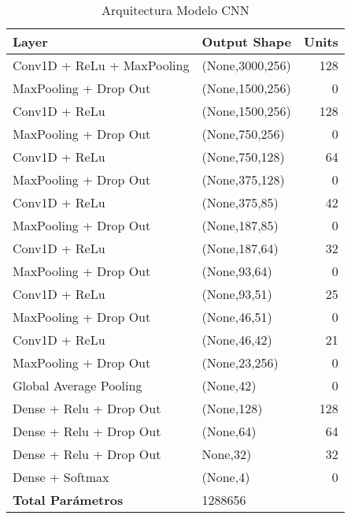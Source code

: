         \begin{table}[htpb]
            \caption{Arquitectura Modelo CNN}
            \begin{center}
            \begin{tabular}{|l|l|r|}
            \hline
            \textbf{Layer} & \textbf{Output Shape} & \multicolumn{1}{l|}{\textbf{Units}} \\ \hline
            Conv1D + ReLu + MaxPooling & (None,3000,256) & 128 \\ \hline
            MaxPooling + Drop Out & (None,1500,256) & 0 \\ \hline
            Conv1D + ReLu & (None,1500,256) & 128 \\ \hline
            MaxPooling + Drop Out & (None,750,256) & 0 \\ \hline
            Conv1D + ReLu & (None,750,128) & 64 \\ \hline
            MaxPooling + Drop Out & (None,375,128) & 0 \\ \hline
            Conv1D + ReLu & (None,375,85) & 42 \\ \hline
            MaxPooling + Drop Out & (None,187,85) & 0 \\ \hline
            Conv1D + ReLu & (None,187,64) & 32 \\ \hline
            MaxPooling + Drop Out & (None,93,64) & 0 \\ \hline
            Conv1D + ReLu & (None,93,51) & 25 \\ \hline
            MaxPooling + Drop Out & (None,46,51) & 0 \\ \hline
            Conv1D + ReLu & (None,46,42) & 21 \\ \hline
            MaxPooling + Drop Out & (None,23,256) & 0 \\ \hline
            Global Average Pooling & (None,42) & 0 \\ \hline
            Dense + Relu + Drop Out & (None,128) & 128 \\ \hline
            Dense + Relu + Drop Out & (None,64) & 64 \\ \hline
            Dense + Relu + Drop Out & None,32) & 32 \\ \hline
            Dense + Softmax & (None,4) & 0 \\ \hline
            \textbf{Total Parámetros} & 1288656 & \\ \hline
            \end{tabular}
            \end{center}
            \label{table:arquitectura modelo cnn}
            \end{table}
    
